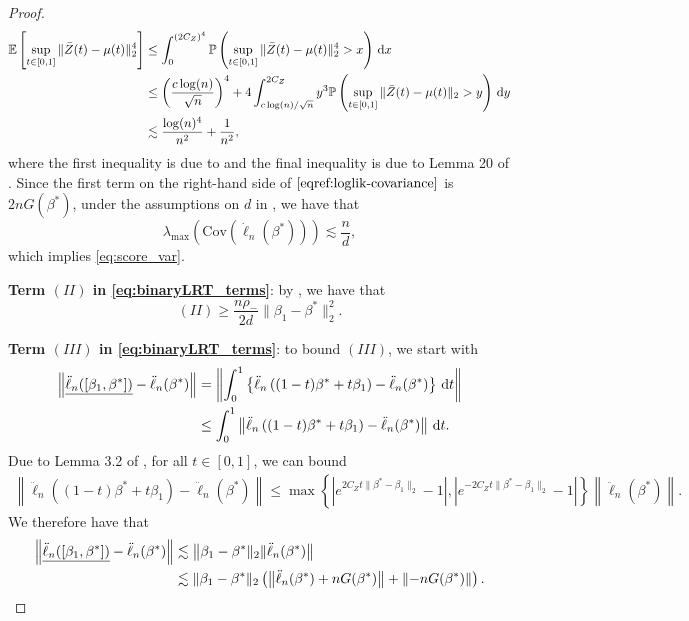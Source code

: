 \documentclass[11pt]{article}
\newcommand{\dint}{\,\mathrm{d}}
\begin{document}
\begin{proof}
 \begin{align}
    \mathbb{E} \left[ \sup_{t \in [0, 1]} \|\bar{Z}(t) - \mu(t)\|_2^4\right] &\leq \int_0^{(2C_Z)^4} \mathbb{P} \left( \sup_{t \in [0, 1]} \|\bar{Z}(t) - \mu(t)\|_2^4 > x\right) \dint x  \notag\\
    &\leq \left(\frac{c \log(n)}{\sqrt{n}} \right)^4 + 4 \int_{c \log(n) / \sqrt{n}}^{2C_Z} y^3 \mathbb{P} \left( \sup_{t \in [0, 1]} \|\bar{Z}(t) - \mu(t)\|_2 > y \right) \dint y \notag\\
    &\lesssim \frac{\log(n)^4}{n^2} + \frac{1}{n^2},
    \label{eq:sample_mean_conv3}
\end{align}
where the first inequality is due to  and the final inequality is  due to Lemma 20 of \cite{FDPCox}. Since the first term on the right-hand side of $\eqref{eqref:loglik-covariance}$ is $2nG(\beta^*)$, under the assumptions on $d$ in , we have that
\begin{equation*}
    \lambda_{\max}\left( \mathrm{Cov}(\dot{\ell}_n(\beta^*)) \right) \lesssim \frac{n}{d},
\end{equation*}
which implies \eqref{eq:score_var}.

\bigskip
\noindent \textbf{Term $(II)$ in \eqref{eq:binaryLRT_terms}}: by , we have that 
\begin{equation}
    (II) \geq  \frac{n \rho_-}{2d} \|\beta_1 - \beta^*\|^2_2.
    \label{eq:binary_mean}
\end{equation}

\bigskip
\noindent \textbf{Term $(III)$ in \eqref{eq:binaryLRT_terms}}: to bound $(III)$, we start with 
\begin{align*}
\left\|\underline{\ddot{\ell}_n([\beta_1, \beta^*])} - \ddot{\ell}_n(\beta^*)\right\| &= \left\| \int_0^1  \left\{\ddot{\ell}_n \left((1-t)\beta^* + t\beta_1 \right) - \ddot{\ell}_n(\beta^*)\right\} \dint t \right\| \notag \\
    &\leq \int_0^1 \left\| \ddot{\ell}_n \left((1-t)\beta^* + t\beta_1 \right) - \ddot{\ell}_n(\beta^*) \right\| \dint t.
\end{align*}
Due to Lemma 3.2 of \cite{huang2013oracle}, for all $t \in [0, 1]$, we can bound 
\begin{align*}
    \left\| \ddot{\ell}_n \left((1-t)\beta^* + t\beta_1 \right) - \ddot{\ell}_n(\beta^*) \right\|  \leq\max \left\{ \left|e^{2C_Z t\|\beta^* - \beta_1\|_2} - 1 \right|, \left|e^{-2 C_Z t\|\beta^* - \beta_1\|_2
    }- 1 \right| \right\} \left\| \ddot{\ell}_n(\beta^*) \right\|.
\end{align*}
We therefore have that 
\begin{align}
\left\|\underline{\ddot{\ell}_n([\beta_1, \beta^*])} -\ddot{\ell}_n(\beta^*)\right\| &\lesssim \left\|\beta_1-\beta^*\|_2\|\ddot{\ell}_n(\beta^*) \right\| \notag \\
&\lesssim \|\beta_1 - \beta^*\|_2 \left( \left\|\ddot{\ell}_n(\beta^*) + nG(\beta^*) \right\| + \left\|-n G(\beta^*) \right\| \right).
\label{eq:perturbed_Hessian}
\end{align}


\end{proof}
\end{document}
